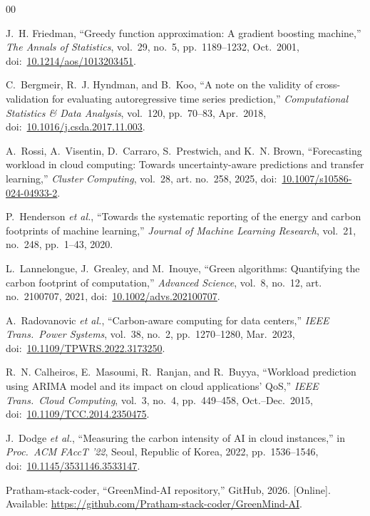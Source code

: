 \documentclass[conference]{IEEEtran}
\begin{document}
\begin{thebibliography}{00}

  J.~H. Friedman, ``Greedy function approximation: A gradient boosting
  machine,'' \emph{The Annals of Statistics}, vol.~29, no.~5,
  pp.~1189--1232, Oct.~2001, doi:~\href{https://doi.org/10.1214/aos/1013203451}{10.1214/aos/1013203451}.

  C.~Bergmeir, R.~J. Hyndman, and B.~Koo, ``A note on the validity of
  cross-validation for evaluating autoregressive time series prediction,''
  \emph{Computational Statistics \& Data Analysis}, vol.~120,
  pp.~70--83, Apr.~2018, doi:~\href{https://doi.org/10.1016/j.csda.2017.11.003}{10.1016/j.csda.2017.11.003}.

  A.~Rossi, A.~Visentin, D.~Carraro, S.~Prestwich, and K.~N. Brown,
  ``Forecasting workload in cloud computing: Towards uncertainty-aware
  predictions and transfer learning,'' \emph{Cluster Computing}, vol.~28,
  art. no.~258, 2025, doi:~\href{https://doi.org/10.1007/s10586-024-04933-2}{10.1007/s10586-024-04933-2}.

  P.~Henderson \emph{et al.}, ``Towards the systematic reporting of the
  energy and carbon footprints of machine learning,''
  \emph{Journal of Machine Learning Research}, vol.~21, no.~248,
  pp.~1--43, 2020.

  L.~Lannelongue, J.~Grealey, and M.~Inouye, ``Green algorithms:
  Quantifying the carbon footprint of computation,''
  \emph{Advanced Science}, vol.~8, no.~12, art. no.~2100707, 2021,
  doi:~\href{https://doi.org/10.1002/advs.202100707}{10.1002/advs.202100707}.

  A.~Radovanovic \emph{et al.}, ``Carbon-aware computing for data centers,''
  \emph{IEEE Trans.\ Power Systems}, vol.~38, no.~2, pp.~1270--1280,
  Mar.~2023, doi:~\href{https://doi.org/10.1109/TPWRS.2022.3173250}{10.1109/TPWRS.2022.3173250}.

  R.~N. Calheiros, E.~Masoumi, R.~Ranjan, and R.~Buyya, ``Workload
  prediction using ARIMA model and its impact on cloud applications' QoS,''
  \emph{IEEE Trans.\ Cloud Computing}, vol.~3, no.~4, pp.~449--458,
  Oct.--Dec.~2015, doi:~\href{https://doi.org/10.1109/TCC.2014.2350475}{10.1109/TCC.2014.2350475}.

  J.~Dodge \emph{et al.}, ``Measuring the carbon intensity of AI in cloud
  instances,'' in \emph{Proc.\ ACM FAccT '22}, Seoul, Republic of Korea,
  2022, pp.~1536--1546, doi:~\href{https://doi.org/10.1145/3531146.3533147}{10.1145/3531146.3533147}.

  Pratham-stack-coder, ``GreenMind-AI repository,'' GitHub, 2026. [Online].
  Available: \url{https://github.com/Pratham-stack-coder/GreenMind-AI}.

\end{thebibliography}
\end{document}
